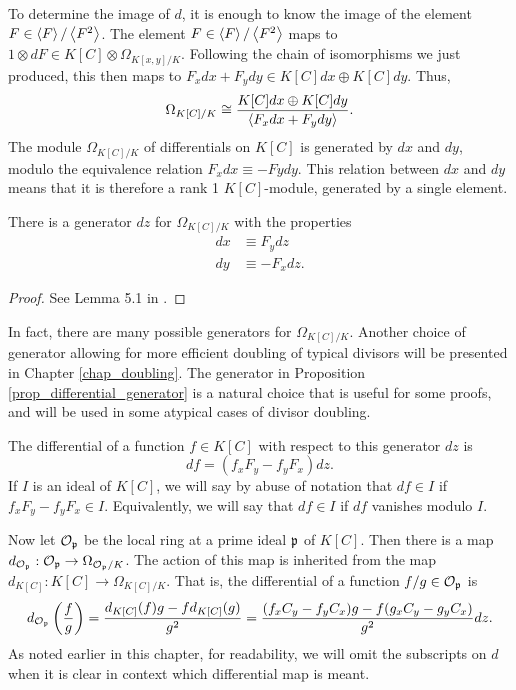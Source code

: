 To determine the image of $d$, it is enough to know the image of the element $F \in \pid F / \pid{F^2}$.
The element $F \in \pid F / \pid{F^2}$ maps to $1 \otimes dF \in K[C] \otimes \Omega_{K[x,y]/K}$.
Following the chain of isomorphisms we just produced, this then maps to $F_xdx + F_ydy \in K[C]dx \oplus K[C]dy$.
Thus,
\[ \Omega_{K[C]/K} \cong \frac {K[C]dx \oplus K[C]dy} {\pid{F_xdx + F_ydy}}. \]
The module $\Omega_{K[C]/K}$ of differentials on $K[C]$ is generated by $dx$ and $dy$,
modulo the equivalence relation $F_xdx \equiv -Fydy$.
This relation between $dx$ and $dy$ means that it is therefore a rank 1 $K[C]$-module, generated by a single element.
\begin{proposition}
  \label{prop_differential_generator}
  There is a generator $dz$ for $\Omega_{K[C]/K}$ with the properties
  \begin{align*}
    dx &\equiv F_ydz \\
    dy &\equiv -F_xdz.
  \end{align*}
\end{proposition}
\begin{proof}
  See Lemma 5.1 in \cite{salem07}.
\end{proof}
In fact, there are many possible generators for $\Omega_{K[C]/K}$.
Another choice of generator allowing for more efficient doubling of typical divisors
will be presented in Chapter \ref{chap_doubling}.
The generator in Proposition \ref{prop_differential_generator} is a natural choice
that is useful for some proofs, and will be used in some atypical cases of divisor doubling.

The differential of a function $f \in K[C]$ with respect to this generator $dz$ is
\[ df = (f_xF_y - f_yF_x)dz. \]
If $I$ is an ideal of $K[C]$,
we will say by abuse of notation that $df \in I$ if $f_xF_y - f_yF_x \in I$.
Equivalently, we will say that $df \in I$ if $df$ vanishes modulo $I$.

Now let $\cal O_{\frak p}$ be the local ring at a prime ideal $\frak p$ of $K[C]$.
Then there is a map $d_{\cal O_{\frak p}} : \cal O_{\frak p} \to \Omega_{\cal O_{\frak p}/K}$.
The action of this map is inherited from the map $d_{K[C]} : K[C] \to \Omega_{K[C]/K}$.
That is, the differential of a function $f/g \in \cal O_{\frak p}$ is
\[ d_{\cal O_{\frak p}} \left( \frac f g \right) = \frac{d_{K[C]}(f)g - fd_{K[C]}(g)}{g^2}
 = \frac{(f_xC_y - f_yC_x)g - f(g_xC_y - g_yC_x)}{g^2} dz . \]
As noted earlier in this chapter, for readability, we will omit the subscripts on $d$
when it is clear in context which differential map is meant.

